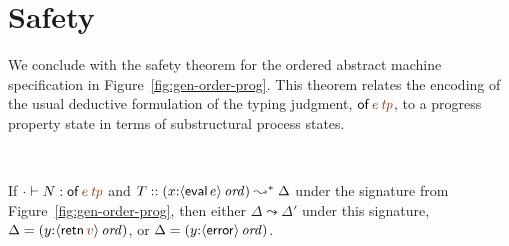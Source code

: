 \section{Safety}

We conclude with the safety theorem for the ordered abstract machine
specification in Figure~\ref{fig:gen-order-prog}. This theorem relates
the encoding of the usual deductive formulation of the typing
judgment, ${\sf of}\,\lf{e}\,\lf{{\it tp}}$, to a progress property
state in terms of substructural process states.

\bigskip
\begin{theorem}~

\smallskip
If $\cdot \vdash N : {\sf of}\,\lf{e}\,\lf{{\it tp}}$
and $T :: (x{:}{\langle {{\sf eval}\,e} \rangle}\,{{\it ord}}) \leadsto^* \Delta$
under the signature from Figure~\ref{fig:gen-order-prog},
then either $\Delta \leadsto \Delta'$ under this 
signature, $\Delta = (y{:}\istrue{\susp{{\sf retn}\,\lf{v}}})$, or
$\Delta = (y{:}{\langle {{\sf error}} \rangle}\,{{\it ord}})$.
\end{theorem}

